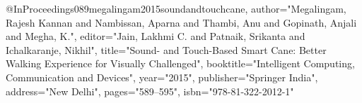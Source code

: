 @InProceedings{089megalingam2015soundandtouchcane,
author="Megalingam, Rajesh Kannan
and Nambissan, Aparna
and Thambi, Anu
and Gopinath, Anjali
and Megha, K.",
editor="Jain, Lakhmi C.
and Patnaik, Srikanta
and Ichalkaranje, Nikhil",
title="Sound- and Touch-Based Smart Cane: Better Walking Experience for Visually Challenged",
booktitle="Intelligent Computing, Communication and Devices",
year="2015",
publisher="Springer India",
address="New Delhi",
pages="589--595",
isbn="978-81-322-2012-1"
}